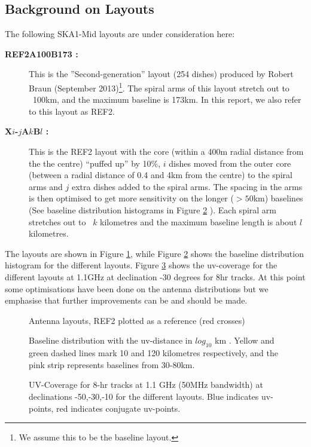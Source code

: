 \documentclass[sfheadings,a4paper,times,10pt,floats,floatfix]{article}
\begin{document}
\subsection{Background on Layouts}\label{sec:layouts}
\vspace{-.1cm}
The following SKA1-Mid layouts are under consideration here:
\begin{description}
\item[{\bf REF2A100B173 :}] This is the ”Second-generation” layout (254 dishes) produced by Robert Braun (September
2013)\footnote{We assume this to be the baseline layout.}. The spiral arms of this layout stretch out to ~100km, and the maximum
baseline is 173km. In this report, we also refer to this layout as REF2. \item[{\bf X$i$-$j$A$k$B$l$ :}] This is the REF2 layout
with the core (within a 400m radial distance from the the centre) ``puffed up'' by 10\%, $i$ dishes moved from the outer core
(between a radial distance of 0.4 and 4km from the centre) to the spiral arms and $j$ extra dishes added to the spiral arms. The
spacing in the arms is then optimised to get more sensitivity on the longer ($>50$km) baselines (See baseline distribution
histograms in Figure \ref{fig:hist} ). Each spiral arm stretches out to ~$k$ kilometres and the maximum baseline length is about
$l$ kilometres.
\end{description}
The  layouts are shown in Figure \ref{fig:lay}, while Figure \ref{fig:hist} shows the baseline distribution histogram for the
different layouts. Figure \ref{fig:uvcov} shows the uv-coverage for the different layouts at 1.1GHz at declination -30 degrees for
8hr tracks. At this point some optimisations have been done on the antenna distributions but we emphasise that further
improvements can be and should be made.
\begin{figure}[!htp]
 \tiny{}
 \caption{Antenna layouts, REF2 plotted as a reference (red crosses)}\label{fig:lay}
\end{figure}

\begin{figure}[!htb]
 \tiny{}
 \caption{Baseline distribution with the uv-distance in $log_{10}$ km . Yellow and green dashed lines mark 10 and 120
kilometres respectively, and the pink strip represents baselines from 30-80km.}\label{fig:hist}
\end{figure}

\begin{figure}[!htb]
 \tiny{}
 \caption{UV-Coverage for 8-hr tracks at 1.1 GHz (50MHz bandwidth) at declinations -50,-30,-10 for the different layouts. Blue
indicates uv-points, red indicates conjugate uv-points.}\label{fig:uvcov}
\end{figure}    
\end{document}
